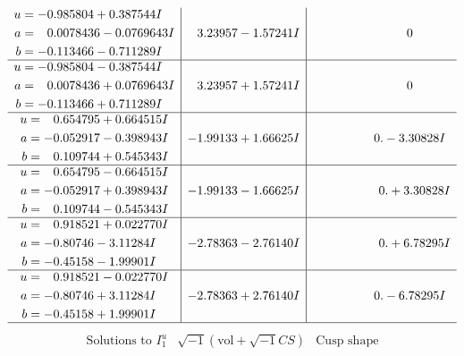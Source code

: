 \documentclass[1p]{elsarticle_modified}
\theoremstyle{definition}
\newcommand{\I}{\sqrt{-1}}
\begin{document}
$$\begin{array}{c|c|c}
\begin{aligned}
u &= -0.985804 + 0.387544 I \\
a &= \phantom{-}0.0078436 - 0.0769643 I \\
b &= -0.113466 - 0.711289 I\end{aligned}
 & \phantom{-}3.23957 - 1.57241 I & \phantom{-0.000000 } 0 \\ \hline\begin{aligned}
u &= -0.985804 - 0.387544 I \\
a &= \phantom{-}0.0078436 + 0.0769643 I \\
b &= -0.113466 + 0.711289 I\end{aligned}
 & \phantom{-}3.23957 + 1.57241 I & \phantom{-0.000000 } 0 \\ \hline\begin{aligned}
u &= \phantom{-}0.654795 + 0.664515 I \\
a &= -0.052917 - 0.398943 I \\
b &= \phantom{-}0.109744 + 0.545343 I\end{aligned}
 & -1.99133 + 1.66625 I & \phantom{-0.000000 } 0. - 3.30828 I \\ \hline\begin{aligned}
u &= \phantom{-}0.654795 - 0.664515 I \\
a &= -0.052917 + 0.398943 I \\
b &= \phantom{-}0.109744 - 0.545343 I\end{aligned}
 & -1.99133 - 1.66625 I & \phantom{-0.000000 -}0. + 3.30828 I \\ \hline\begin{aligned}
u &= \phantom{-}0.918521 + 0.022770 I \\
a &= -0.80746 - 3.11284 I \\
b &= -0.45158 - 1.99901 I\end{aligned}
 & -2.78363 - 2.76140 I & \phantom{-0.000000 -}0. + 6.78295 I \\ \hline\begin{aligned}
u &= \phantom{-}0.918521 - 0.022770 I \\
a &= -0.80746 + 3.11284 I \\
b &= -0.45158 + 1.99901 I\end{aligned}
 & -2.78363 + 2.76140 I & \phantom{-0.000000 } 0. - 6.78295 I\\
 \hline 
 \end{array}$$\newpage$$\begin{array}{c|c|c}  
\text{Solutions to }I^u_{1}& \I (\text{vol} + \sqrt{-1}CS) & \text{Cusp shape}\\

\end{array}$$
\end{document}
